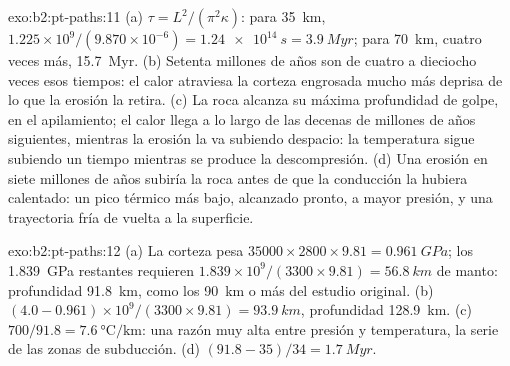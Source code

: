 \begin{solution}{exo:b2:pt-paths:11}
(a) $\tau = L^2/(\pi^2\kappa)$: para \qty{35}{km}, $1.225\times10^9/(9.870\times10^{-6}) =
\qty{1.24e14}{s} = \qty{3.9}{Myr}$; para \qty{70}{km}, cuatro veces más,
\qty{15.7}{Myr}. (b) Setenta millones de años son de cuatro a dieciocho veces esos tiempos: el calor
atraviesa la corteza engrosada mucho más deprisa de lo que la erosión la retira. (c) La roca
alcanza su máxima profundidad de golpe, en el apilamiento; el calor llega a lo largo de las
decenas de millones de años siguientes, mientras la erosión la va subiendo despacio: la temperatura sigue
subiendo un tiempo mientras se produce la descompresión. (d) Una erosión en siete millones de años
subiría la roca antes de que la conducción la hubiera calentado: un pico térmico más bajo, alcanzado
pronto, a mayor presión, y una trayectoria fría de vuelta a la superficie.
\end{solution}

\begin{solution}{exo:b2:pt-paths:12}
(a) La corteza pesa $35000\times2800\times9.81 = \qty{0.961}{GPa}$; los
\qty{1.839}{GPa} restantes requieren $1.839\times10^9/(3300\times9.81) = \qty{56.8}{km}$ de manto: profundidad
\qty{91.8}{km}, como los \qty{90}{km} o más del estudio original. (b) $(4.0 -
0.961)\times10^9/(3300\times9.81) = \qty{93.9}{km}$, profundidad \qty{128.9}{km}.
(c) $700/91.8 = \qty{7.6}{\celsius\per\km}$: una razón muy alta entre presión y
temperatura, la serie de las zonas de subducción. (d) $(91.8 - 35)/34 = \qty{1.7}{Myr}$.
\end{solution}


